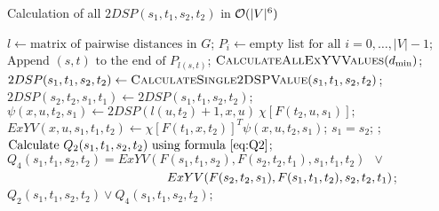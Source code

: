 \begin{algorithm}
\caption{Calculation of all $2DSP(s_1, t_1, s_2, t_2)$ in $\mathcal{O}(|V|^6)$} \label{alg:n6}
\begin{algorithmic}[1]
\State $l \gets \text{matrix of pairwise distances in }G$;
\State $P_i \gets \text{empty list for all }i = 0, \ldots, |V|-1$;
    \State $\text{Append }(s, t)\text{ to the end of }P_{l(s, t)}$;
\EndFor
{}
    \State $\textsc{CalculateAllExYVValues}(d_{\min})$; \label{line:calcExYV}
                \State $2DSP(s_1, t_1, s_2, t_2) \gets \textsc{CalculateSingle2DSPValue}(s_1, t_1, s_2, t_2)$;
                \State $2DSP(s_2, t_2, s_1, t_1) \gets 2DSP(s_1, t_1, s_2, t_2)$; 
            \EndFor
        \EndFor
    \EndFor
\EndFor
\EndProcedure
\Statex
{}
            \State $\psi(x, u, t_2, s_1) \gets 2DSP(l(u, t_2) + 1, x, u)~\chi[F(t_2, u, s_1)]; \label{line:psi}$
        \EndFor
    \EndFor
                \State $ExYV(x, u, s_1, t_1, t_2) \gets \chi[F(t_1, x, t_2)]^T \psi(x, u, t_2, s_1)$; \label{line:ExYVpsi}
            \EndFor
        \EndFor
    \EndFor
\EndProcedure
\Statex
{}
    \State \Return $s_1 = s_2$; 
    \State {};
\Else
    \State $\text{Calculate }Q_2(s_1, t_1, s_2, t_2)\text{ using formula \eqref{eq:Q2}}$; 
    \State $Q_4(s_1, t_1, s_2, t_2) = ExYV(F(s_1, t_1, s_2), F(s_2, t_2, t_1), s_1, t_1, t_2)\enspace\vee\enspace$ 
    \Statex $\hspace{4.5cm}ExYV(F(s_2, t_2, s_1), F(s_1, t_1, t_2), s_2, t_2, t_1)$; \label{line:useExYV}
    \State \Return $Q_2(s_1, t_1, s_2, t_2) \vee Q_4(s_1, t_1, s_2, t_2)$;
\EndIf
\EndProcedure
\end{algorithmic}
\end{algorithm}


